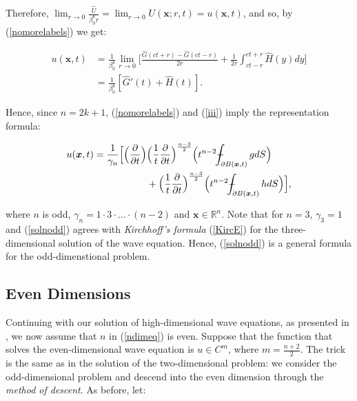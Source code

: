 \documentclass[a4paper, 12pt]{article}
\def\Xint#1{\mathchoice
{\XXint\displaystyle\textstyle{#1}}%
{\XXint\textstyle\scriptstyle{#1}}%
{\XXint\scriptstyle\scriptscriptstyle{#1}}%
{\XXint\scriptscriptstyle\scriptscriptstyle{#1}}%
\!\int}
\def\XXint#1#2#3{{\setbox0=\hbox{$#1{#2#3}{\int}$ }
\vcenter{\hbox{$#2#3$ }}\kern-.6\wd0}}
\def\dashint{\Xint-}
\numberwithin{equation}{section}
\begin{document}
Therefore, $\lim_{r \rightarrow 0} \frac{\hat{U}}{\beta_0^k r}=\lim_{r
\rightarrow 0} U(\boldsymbol{x}; r, t)=u(\boldsymbol{x}, t)$, and so, by
(\ref{nomorelabels}) we get:

\begin{equation*}
    \begin{aligned}
        u(\boldsymbol{x}, t)&=\frac{1}{\beta_0^k} \lim_{r \rightarrow 0}\Big[\frac{\hat{G}(ct+r)-\hat{G}(ct-r)}{2r} + \frac{1}{2r}\int_{ct-r}^{ct+r} \hat{H}(y)dy\Big]\\
        &= \frac{1}{\beta_0^k}[\hat{G}'(t)+\hat{H}(t)].
    \end{aligned}
\end{equation*}

Hence, since $n=2k+1$, (\ref{nomorelabels}) and (\ref{iii}) imply the
representation formula:

\begin{equation} \label{solnodd}
    \begin{split}
        u(\boldsymbol{x}, t)=\frac{1}{\gamma_n}\Big[\Big(\diffp[1]{}{t}\Big) & \Big(\frac{1}{t} \diffp[1]{}{t} \Big)^{\frac{n-3}{2}}\Big(t^{n-2} \dashint_{\partial B(\boldsymbol{x},t)}gdS \Big)\\
        &+ \Big(\frac{1}{t} \diffp[1]{}{t} \Big)^{\frac{n-3}{2}}\Big(t^{n-2} \dashint_{\partial B(\boldsymbol{x},t)}hdS \Big)\Big],
    \end{split}
\end{equation} 

where $n$ is odd, $\gamma_n=1 \cdot 3 \cdot ... \cdot (n-2)$ and
$\boldsymbol{x}\in \mathbb{R}^n$. Note that for $n=3$, $\gamma_3 = 1$ and
(\ref{solnodd}) agrees with \emph{Kirchhoff's formula} (\ref{KircE}) for the
three-dimensional solution of the wave equation. Hence, (\ref{solnodd}) is a
general formula for the odd-dimenstional problem.

\subsection{Even Dimensions}
Continuing with our solution of high-dimensional wave equations, as presented in
\cite[Ch. 2.4.1.e]{Ev}, we now assume that $n$ in (\ref{ndimeq}) is even.
Suppose that the function that solves the even-dimensional wave equation is $u
\in C^m$, where $m=\frac{n+2}{2}$. The trick is the same as in the solution of
the two-dimensional problem: we consider the odd-dimensional problem and descend
into the even dimension through the \emph{method of descent}. As before, let:
\end{document}
